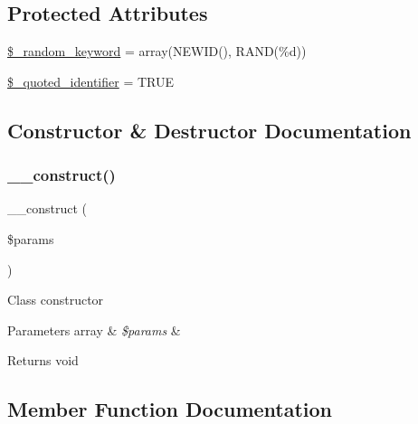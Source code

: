 \subsection*{Protected Attributes}
\begin{DoxyCompactItemize}
\item 
\mbox{\hyperlink{class_c_i___d_b__sqlsrv__driver_a10213aa6e05f6d924d3277bb1d2fea00}{\$\+\_\+random\+\_\+keyword}} = array(\textquotesingle{}N\+E\+W\+ID()\textquotesingle{}, \textquotesingle{}R\+A\+ND(\%d)\textquotesingle{})
\item 
\mbox{\hyperlink{class_c_i___d_b__sqlsrv__driver_a1dae2f0e9ad7299438a9976d6cdbf2ad}{\$\+\_\+quoted\+\_\+identifier}} = T\+R\+UE
\end{DoxyCompactItemize}


\subsection{Constructor \& Destructor Documentation}
\mbox{\label{class_c_i___d_b__sqlsrv__driver_a9162320adff1a1a4afd7f2372f753a3e}} 
\subsubsection{\texorpdfstring{\+\_\+\+\_\+construct()}{\_\_construct()}}
{\footnotesize\ttfamily \+\_\+\+\_\+construct (\begin{DoxyParamCaption}\item[{}]{\$params }\end{DoxyParamCaption})}

Class constructor


\begin{DoxyParams}[1]{Parameters}
array & {\em \$params} & \\
\hline
\end{DoxyParams}
\begin{DoxyReturn}{Returns}
void 
\end{DoxyReturn}


\subsection{Member Function Documentation}
\mbox{\label{class_c_i___d_b__sqlsrv__driver_a4d9082658000e5ede8312067c6dda9db}} 
